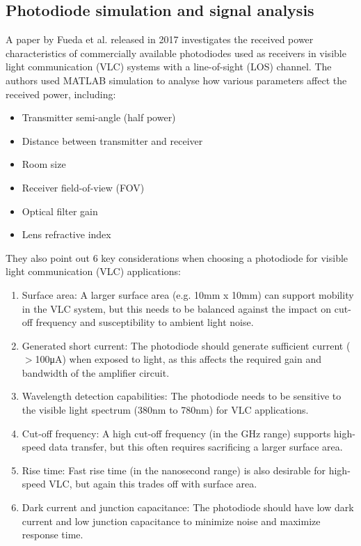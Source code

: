 \subsection{Photodiode simulation and signal analysis}
A paper by Fueda et al. released in 2017 investigates the received power characteristics of commercially available photodiodes used as receivers in visible light communication (VLC) systems with a line-of-sight (LOS) channel. The authors used MATLAB simulation to analyse how various parameters affect the received power, including:

\begin{itemize}
    \item Transmitter semi-angle (half power)
    \item Distance between transmitter and receiver
    \item Room size
    \item Receiver field-of-view (FOV)
    \item Optical filter gain
    \item Lens refractive index
\end{itemize}

They also point out 6 key considerations when choosing a photodiode for visible light communication (VLC) applications:

\begin{enumerate}
    \item Surface area: A larger surface area (e.g. 10mm x 10mm) can support mobility in the VLC system, but this needs to be balanced against the impact on cut-off frequency and susceptibility to ambient light noise.
    
    \item Generated short current: The photodiode should generate sufficient current ($>$100μA) when exposed to light, as this affects the required gain and bandwidth of the amplifier circuit.
    
    \item Wavelength detection capabilities: The photodiode needs to be sensitive to the visible light spectrum (380nm to 780nm) for VLC applications.
    
    \item Cut-off frequency: A high cut-off frequency (in the GHz range) supports high-speed data transfer, but this often requires sacrificing a larger surface area.
    
    \item Rise time: Fast rise time (in the nanosecond range) is also desirable for high-speed VLC, but again this trades off with surface area.
    
    \item Dark current and junction capacitance: The photodiode should have low dark current and low junction capacitance to minimize noise and maximize response time.
\end{enumerate}


